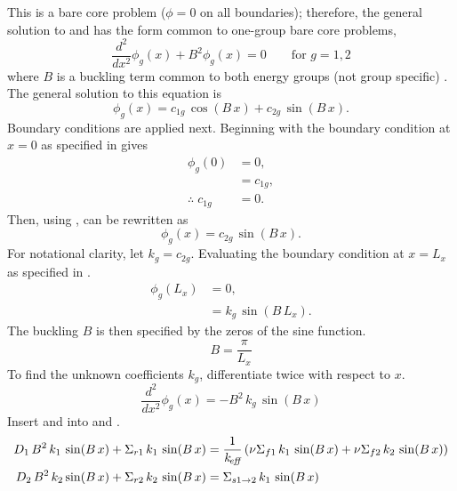   This is a bare core problem ($\phi=0$ on all boundaries); therefore, the 
  general solution to  and  has the form common
  to one-group bare core problems,
  \begin{equation}
    \label{eq:multigroup_buckle}
    \frac{d^2}{dx^2} \phi_g(x) + B^2 \phi_g(x) = 0 \qquad \text{for } g=1,2
  \end{equation}
  where $B$ is a buckling term common to both energy groups (not group
  specific) \cite{textbookhenry}. The general solution to this equation is
  \begin{equation}
    \label{eq:multigroup_general}
    \phi_g(x) = c_{1g} \, \cos(B\,x) + c_{2g} \, \sin(B\,x).
  \end{equation}
  Boundary conditions are applied next. Beginning with the boundary condition at
  $x=0$ as specified in  gives
  \begin{align}
    \phi_g(0) &= 0, \\
    &= c_{1g}, \\
    \label{eq:1d2g_c1g}
    \therefore \; c_{1g} &= 0.
  \end{align}
  Then, using ,  can be rewritten 
  as
  \begin{equation}
    \label{eq:1d2g_sin}
    \phi_g(x) = c_{2g} \, \sin(B\,x).
  \end{equation}
  For notational clarity, let $k_g = c_{2g}$.
  Evaluating the boundary condition at $x=L_x$ as specified in
  .
  \begin{align}
    \phi_g(L_x) &= 0 ,\\
    &= k_g \, \sin(B \, L_x).
  \end{align}
  The buckling $B$ is then specified by the zeros of the sine function.
  \begin{equation}
    \label{eq:1d2g_buckle_geom}
    B = \frac{\pi}{L_x}
  \end{equation}
  To find the unknown coefficients $k_g$, differentiate 
  twice with respect to $x$.
  \begin{equation}
    \label{eq:1d2g_sin_d2}
    \frac{d^2}{dx^2} \phi_g(x) = - B^2 \, k_g \, \sin(B\,x)
  \end{equation}
  Insert  and  into  and
  .
  \begin{align}
    D_1 \, B^2 \, k_1 \, \sin(B\,x) + \Sigma_{r1} \, k_1 \, \sin(B\,x) &=
      \frac{1}{k_{\!\mbox{\scriptsize \em eff}}} \left( \nu \Sigma_{f1} \, k_1 \, \sin(B \, x) + \nu
      \Sigma_{f2} \, k_2 \, \sin(B\,x) \right) \\
    D_2 \, B^2 \, k_2 \sin(B\,x) + \Sigma_{r2} \, k_2 \, \sin(B\,x) &=
      \Sigma_{s 1\rightarrow 2} \, k_1 \, \sin(B\,x)
  \end{align}
